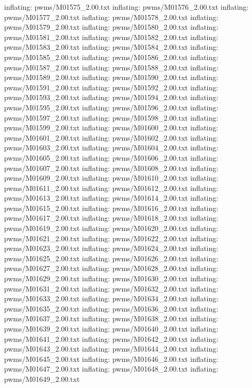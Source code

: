 \documentclass[letterpaper,10pt,english]{sphinxmanual}
\begin{document}
{\begin{sphinxVerbatim}[commandchars=\\\{\}]
  inflating: pwms/M01575\_2.00.txt
  inflating: pwms/M01576\_2.00.txt
  inflating: pwms/M01577\_2.00.txt
  inflating: pwms/M01578\_2.00.txt
  inflating: pwms/M01579\_2.00.txt
  inflating: pwms/M01580\_2.00.txt
  inflating: pwms/M01581\_2.00.txt
  inflating: pwms/M01582\_2.00.txt
  inflating: pwms/M01583\_2.00.txt
  inflating: pwms/M01584\_2.00.txt
  inflating: pwms/M01585\_2.00.txt
  inflating: pwms/M01586\_2.00.txt
  inflating: pwms/M01587\_2.00.txt
  inflating: pwms/M01588\_2.00.txt
  inflating: pwms/M01589\_2.00.txt
  inflating: pwms/M01590\_2.00.txt
  inflating: pwms/M01591\_2.00.txt
  inflating: pwms/M01592\_2.00.txt
  inflating: pwms/M01593\_2.00.txt
  inflating: pwms/M01594\_2.00.txt
  inflating: pwms/M01595\_2.00.txt
  inflating: pwms/M01596\_2.00.txt
  inflating: pwms/M01597\_2.00.txt
  inflating: pwms/M01598\_2.00.txt
  inflating: pwms/M01599\_2.00.txt
  inflating: pwms/M01600\_2.00.txt
  inflating: pwms/M01601\_2.00.txt
  inflating: pwms/M01602\_2.00.txt
  inflating: pwms/M01603\_2.00.txt
  inflating: pwms/M01604\_2.00.txt
  inflating: pwms/M01605\_2.00.txt
  inflating: pwms/M01606\_2.00.txt
  inflating: pwms/M01607\_2.00.txt
  inflating: pwms/M01608\_2.00.txt
  inflating: pwms/M01609\_2.00.txt
  inflating: pwms/M01610\_2.00.txt
  inflating: pwms/M01611\_2.00.txt
  inflating: pwms/M01612\_2.00.txt
  inflating: pwms/M01613\_2.00.txt
  inflating: pwms/M01614\_2.00.txt
  inflating: pwms/M01615\_2.00.txt
  inflating: pwms/M01616\_2.00.txt
  inflating: pwms/M01617\_2.00.txt
  inflating: pwms/M01618\_2.00.txt
  inflating: pwms/M01619\_2.00.txt
  inflating: pwms/M01620\_2.00.txt
  inflating: pwms/M01621\_2.00.txt
  inflating: pwms/M01622\_2.00.txt
  inflating: pwms/M01623\_2.00.txt
  inflating: pwms/M01624\_2.00.txt
  inflating: pwms/M01625\_2.00.txt
  inflating: pwms/M01626\_2.00.txt
  inflating: pwms/M01627\_2.00.txt
  inflating: pwms/M01628\_2.00.txt
  inflating: pwms/M01629\_2.00.txt
  inflating: pwms/M01630\_2.00.txt
  inflating: pwms/M01631\_2.00.txt
  inflating: pwms/M01632\_2.00.txt
  inflating: pwms/M01633\_2.00.txt
  inflating: pwms/M01634\_2.00.txt
  inflating: pwms/M01635\_2.00.txt
  inflating: pwms/M01636\_2.00.txt
  inflating: pwms/M01637\_2.00.txt
  inflating: pwms/M01638\_2.00.txt
  inflating: pwms/M01639\_2.00.txt
  inflating: pwms/M01640\_2.00.txt
  inflating: pwms/M01641\_2.00.txt
  inflating: pwms/M01642\_2.00.txt
  inflating: pwms/M01643\_2.00.txt
  inflating: pwms/M01644\_2.00.txt
  inflating: pwms/M01645\_2.00.txt
  inflating: pwms/M01646\_2.00.txt
  inflating: pwms/M01647\_2.00.txt
  inflating: pwms/M01648\_2.00.txt
  inflating: pwms/M01649\_2.00.txt

\end{sphinxVerbatim}}
\end{document}
